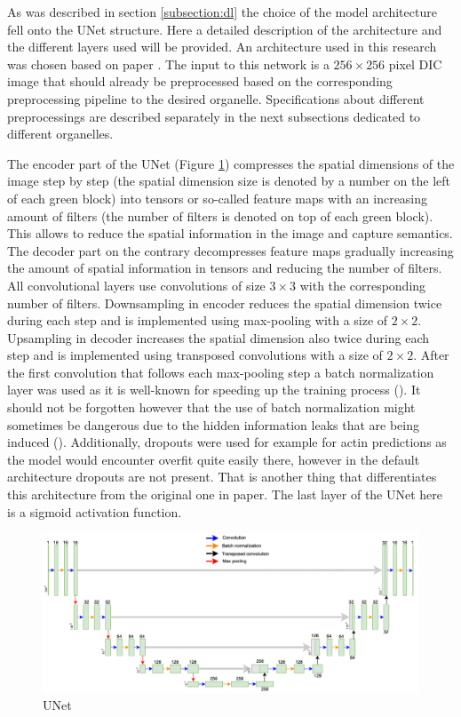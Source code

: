 As was described in section \ref{subsection:dl} the choice of the model architecture fell onto the UNet structure. Here a detailed description of the architecture and the different layers used will be provided. An architecture used in this research was chosen based on paper \cite{Lachance_2020}. The input to this network is a $256 \times 256$ pixel DIC image that should already be preprocessed based on the corresponding preprocessing pipeline to the desired organelle. Specifications about different preprocessings are described separately in the next subsections dedicated to different organelles.

The encoder part of the UNet (Figure \ref{fig:unet}) compresses the spatial dimensions of the image step by step (the spatial dimension size is denoted by a number on the left of each green block) into tensors or so-called feature maps with an increasing amount of filters (the number of filters is denoted on top of each green block). This allows to reduce the spatial information in the image and capture semantics. The decoder part on the contrary decompresses feature maps gradually increasing the amount of spatial information in tensors and reducing the number of filters. All convolutional layers use convolutions of size $3 \times 3$ with the corresponding number of filters. Downsampling in encoder reduces the spatial dimension twice during each step and is implemented using max-pooling with a size of $2 \times 2$. Upsampling in decoder increases the spatial dimension also twice during each step and is implemented using transposed convolutions with a size of $2 \times 2$. After the first convolution that follows each max-pooling step a batch normalization layer was used as it is well-known for speeding up the training process (\cite{Ioffe_2015}). It should not be forgotten however that the use of batch normalization might sometimes be dangerous due to the hidden information leaks that are being induced (\cite{fetterman}). Additionally, dropouts were used for example for actin predictions as the model would encounter overfit quite easily there, however in the default architecture dropouts are not present. That is another thing that differentiates this architecture from the original one in \cite{Lachance_2020} paper. The last layer of the UNet here is a sigmoid activation function.
\begin{figure}[htb]
	\begin{center}
		\includegraphics[width=\linewidth]{bilder/Unet.png}
		\caption{UNet}\label{fig:unet}
	\end{center}
\end{figure}

